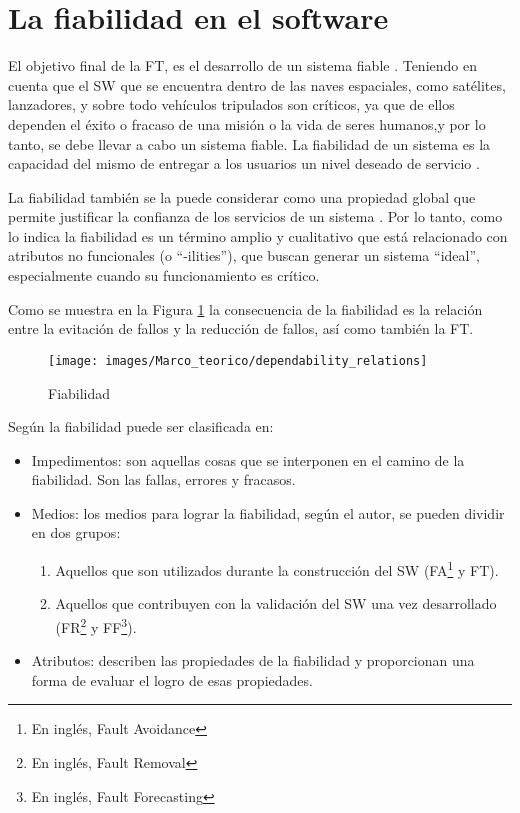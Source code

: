 \section{La fiabilidad en el software}\label{sec:fiabilidad_software}
El objetivo final de la \ac{FT}, es el desarrollo de un sistema fiable \citep{FTDesign}. Teniendo
en cuenta que el \ac{SW} que se encuentra dentro de las naves espaciales, como satélites,
lanzadores, y sobre todo vehículos tripulados son críticos, ya que de ellos dependen el éxito o
fracaso de una misión o la vida de seres humanos,y por lo tanto, se debe llevar a cabo un sistema fiable.
La fiabilidad de un sistema es la capacidad del mismo de entregar a los usuarios un nivel
deseado de servicio \citep{FTDesign}.

La fiabilidad también se la puede considerar como una propiedad global que permite justificar la
confianza de los servicios de un sistema \citep{FTAvionics}. Por lo tanto, como lo indica
\cite{FTAvionics} la fiabilidad es un término amplio y cualitativo que está relacionado con
atributos no funcionales (o ``-ilities''), que buscan generar un sistema ``ideal'', especialmente
cuando su funcionamiento es crítico.

Como se muestra en la Figura \ref{fig:dependability_relations} la consecuencia de la fiabilidad es
la relación entre la evitación de fallos y la reducción de fallos, así como también la \ac{FT}.

\begin{figure}[h]
 \centering
 \texttt{[image: images/Marco\_teorico/dependability\_relations]}
  \caption{Fiabilidad \protect\citep{FTAvionics}}
\label{fig:dependability_relations}
\end{figure}

Según \cite{Pullum01} la fiabilidad puede ser clasificada en:
\begin{itemize}
 \item Impedimentos: son aquellas cosas que se interponen en el camino de la fiabilidad. Son las
fallas, errores y fracasos.
 \item Medios: los medios para lograr la fiabilidad, según el autor, se pueden dividir en dos
grupos:
  \begin{enumerate}
    \item Aquellos que son utilizados durante la construcción del \ac{SW} (\ac{FA}\footnote{En
    inglés, Fault Avoidance} y \ac{FT}).
    \item Aquellos que contribuyen con la validación del \ac{SW} una vez desarrollado
    (\ac{FR}\footnote{En inglés, Fault Removal} y \ac{FF}\footnote{En inglés, Fault Forecasting}).
  \end{enumerate}

 \item Atributos: describen las propiedades de la fiabilidad y proporcionan una forma de evaluar el
logro de esas propiedades.
\end{itemize}

